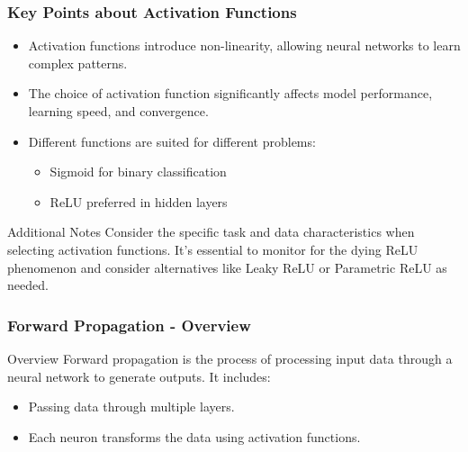\documentclass[aspectratio=169]{beamer}
\begin{document}
\begin{frame}[fragile]
    \frametitle{Key Points about Activation Functions}
    \begin{itemize}
        \item Activation functions introduce non-linearity, allowing neural networks to learn complex patterns.
        \item The choice of activation function significantly affects model performance, learning speed, and convergence.
        \item Different functions are suited for different problems: 
            \begin{itemize}
                \item Sigmoid for binary classification
                \item ReLU preferred in hidden layers
            \end{itemize}
    \end{itemize}
    
    \begin{block}{Additional Notes}
        Consider the specific task and data characteristics when selecting activation functions.
        It’s essential to monitor for the dying ReLU phenomenon and consider alternatives like Leaky ReLU or Parametric ReLU as needed.
    \end{block}
\end{frame}

\begin{frame}[fragile]
    \frametitle{Forward Propagation - Overview}
    \begin{block}{Overview}
        Forward propagation is the process of processing input data through a neural network to generate outputs. It includes:
        \begin{itemize}
            \item Passing data through multiple layers.
            \item Each neuron transforms the data using activation functions.
        \end{itemize}
    \end{block}
\end{frame}
\end{document}
